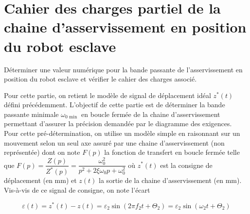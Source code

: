 
%


\section{Cahier des charges partiel de la chaine d'asservissement en position du robot esclave}
\begin{obj}
Déterminer une valeur numérique pour la bande passante de l'asservissement en position du robot esclave et vérifier le cahier des charges associé.
\end{obj}

Pour cette partie, on retient le modèle de signal de déplacement idéal $z^{*}(t)$ défini précédemment. L'objectif de cette partie est de déterminer la bande passante minimale $\omega_{0 \text { min }}$ en boucle fermée de la chaine d'asservissement permettant d'assurer la précision demandée par le diagramme des exigences.\\
Pour cette pré-détermination, on utilise un modèle simple en raisonnant sur un mouvement selon un seul axe assuré par une chaine d'asservissement (non représentée) dont on note $F(p)$ la fonction de transfert en boucle fermée telle que $F(p)=\dfrac{Z(p)}{Z^{*}(p)}=\dfrac{\omega_{0}^{2}}{p^{2}+2 \xi \omega_{0} p+\omega_{0}^{2}}$ où $z^{*}(t)$ est la consigne de déplacement (en mm) et $z(t)$ la sortie de la chaine d'asservissement (en mm). Vis-à-vis de ce signal de consigne, on note l'écart

$$
\varepsilon(t)=z^{*}(t)-z(t)=\varepsilon_{2} \sin \left(2 \pi f_{2} t+\Theta_{2}\right)=\varepsilon_{2} \sin \left(\omega_{2} t+\Theta_{2}\right)
$$

